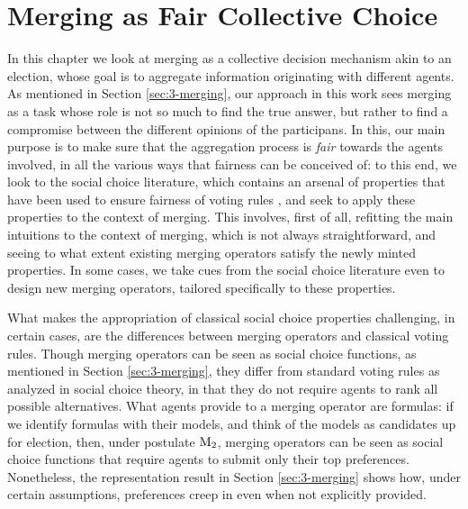 \chapter{Merging as Fair Collective Choice}\label{ch:5}
In this chapter we look at merging as a collective decision mechanism
akin to an election, whose goal is to aggregate information originating 
with different agents.
As mentioned in Section \ref{sec:3-merging},
our approach in this work sees merging as a task 
whose role is not so much to find the true answer, but 
rather to find a compromise between the different opinions 
of the participans.
In this, our main purpose is to make sure that the aggregation process 
is \emph{fair} towards the agents involved, in all the various ways 
that fairness can be conceived of:
to this end, we look to the social choice literature,
which contains an arsenal of properties that have been used 
to ensure fairness of voting rules
\cite{Zwicker16,BaumeisterR16},
and seek to apply these properties to the context of merging.
This involves, first of all, refitting the main intuitions
to the context of merging, which is not always straightforward,
and seeing to what extent existing merging operators satisfy 
the newly minted properties.
In some cases, we take cues from the social choice literature 
even to design new merging operators, tailored specifically to these properties.

What makes the appropriation of classical social choice properties 
challenging, in certain cases, are the differences between merging 
operators and classical voting rules.
Though merging operators can be seen as social choice functions,
as mentioned in Section \ref{sec:3-merging},
they differ from standard voting rules as analyzed in social choice theory,
in that they do not require agents to rank all possible alternatives.
What agents provide to a merging operator are formulas:
if we identify formulas with their models, 
and think of the models as candidates up for election, 
then, under postulate $\mathrm{M}_{2}$, merging operators 
can be seen as social choice functions that require agents 
to submit only their top preferences.
Nonetheless, the representation result in Section \ref{sec:3-merging}
shows how, under certain assumptions, 
preferences creep in even when not explicitly provided.


